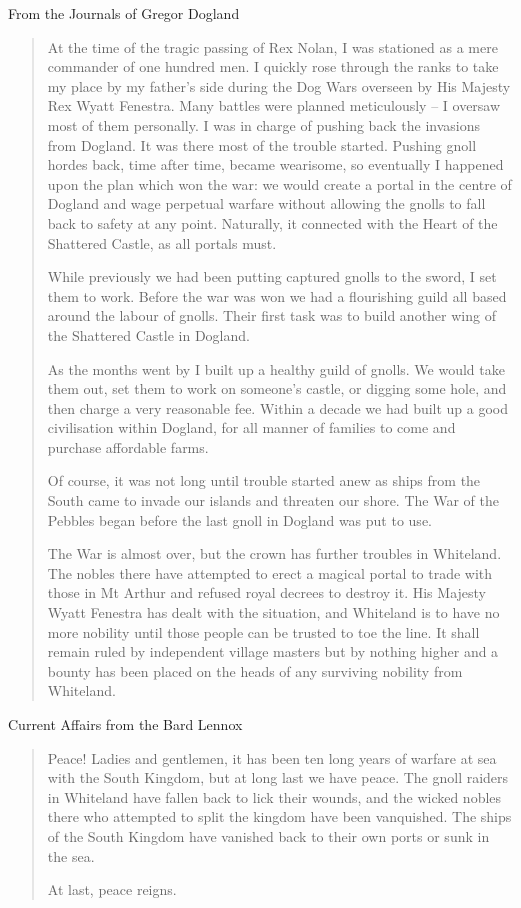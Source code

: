 From the Journals of Gregor Dogland

\begin{quotation}
At the time of the tragic passing of Rex Nolan, I was stationed as a mere commander of one hundred men.  I quickly rose through the ranks to take my place by my father's side during the Dog Wars overseen by His Majesty Rex Wyatt Fenestra.  Many battles were planned meticulously -- I oversaw most of them personally.  I was in charge of pushing back the invasions from Dogland.  It was there most of the trouble started.  Pushing gnoll hordes back, time after time, became wearisome, so eventually I happened upon the plan which won the war: we would create a portal in the centre of Dogland and wage perpetual warfare without allowing the gnolls to fall back to safety at any point.  Naturally, it connected with the Heart of the Shattered Castle, as all portals must.

	While previously we had been putting captured gnolls to the sword, I set them to work.  Before the war was won we had a flourishing guild all based around the labour of gnolls.  Their first task was to build another wing of the Shattered Castle in Dogland.

	As the months went by I built up a healthy guild of gnolls.  We would take them out, set them to work on someone's castle, or digging some hole, and then charge a very reasonable fee.  Within a decade we had built up a good civilisation within Dogland, for all manner of families to come and purchase affordable farms.

	Of course, it was not long until trouble started anew as ships from the South came to invade our islands and threaten our shore.  The War of the Pebbles began before the last gnoll in Dogland was put to use.

	The War is almost over, but the crown has further troubles in Whiteland.  The nobles there have attempted to erect a magical portal to trade with those in Mt Arthur and refused royal decrees to destroy it.  His Majesty Wyatt Fenestra has dealt with the situation, and Whiteland is to have no more nobility until those people can be trusted to toe the line.  It shall remain ruled by independent village masters but by nothing higher and a bounty has been placed on the heads of any surviving nobility from Whiteland.
\end{quotation}

Current Affairs from the Bard Lennox

\begin{quotation}
Peace!  Ladies and gentlemen, it has been ten long years of warfare at sea with the South Kingdom, but at long last we have peace.  The gnoll raiders in Whiteland have fallen back to lick their wounds, and the wicked nobles there who attempted to split the kingdom have been vanquished.  The ships of the South Kingdom have vanished back to their own ports or sunk in the sea.

	At last, peace reigns.
\end{quotation}

